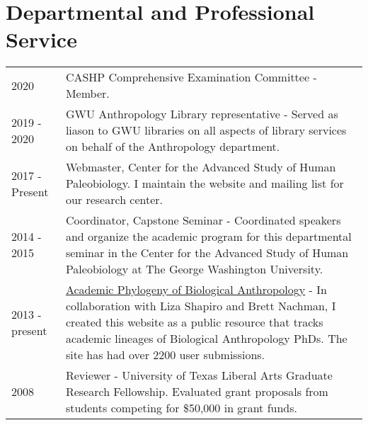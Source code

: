 \documentclass{article}
\begin{document}
 
\section*{Departmental and Professional Service}
\begin{longtable}{p{}p{}}
2020 & CASHP Comprehensive Examination Committee - Member.\\[4pt]
2019 - 2020 & GWU Anthropology Library representative - Served as liason to GWU libraries on all aspects of library services on behalf of the Anthropology department.\\[4pt]
2017 - Present & Webmaster, Center for the Advanced Study of Human Paleobiology. I maintain the website and mailing list for our research center.\\[4pt]
2014 - 2015 & Coordinator, Capstone Seminar - Coordinated speakers and organize the academic program for this departmental seminar in the Center for the Advanced Study of Human Paleobiology at The George Washington University. \\[4pt]
2013 - present &  \href{https://bioanthtree.org}{Academic Phylogeny of Biological Anthropology} - In collaboration with Liza Shapiro and Brett Nachman, I created this website as a public resource that tracks academic lineages of Biological Anthropology PhDs. The site has had over 2200 user submissions.\\[4pt]

 2008 & Reviewer - University of Texas Liberal Arts Graduate Research Fellowship. Evaluated grant proposals from students competing for \$50,000 in grant funds.\\
\end{longtable}
\end{document}
